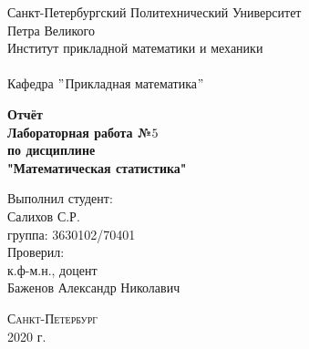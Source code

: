 \documentclass[a4]{article}
\begin{document}
	\def\contentsname{\LARGE{Содержание}}
	\thispagestyle{empty}
	\begin{center} 
		\vspace{2cm} 
		{\Large \sc Санкт-Петербургский Политехнический Университет}\\
		\vspace{2mm}
		{\Large\sc Петра Великого}\\
		\vspace{1cm}
		{\large \sc Институт прикладной математики и механики\\ 
			\vspace{0.5mm}
			\textsc{}}\\ 
		\vspace{0.5mm}
		{\large\sc Кафедра $"$Прикладная математика$"$}\\
		\vspace{15mm}
		
		
		{\sc \textbf{Отчёт\\
			Лабораторная работа №$5$\\
			по дисциплине\\
			"Математическая статистика"}
			\vspace{6mm}
			
		}
		\vspace*{2mm}
		
		
		\begin{flushleft}
			\vspace{4cm}
			\sc Выполнил студент:\\
			\sc Салихов С.Р.\\
			\sc группа: 3630102/70401\\
			\vspace{1cm}
			\sc Проверил:\\
			\sc к.ф-м.н., доцент\\
			\sc Баженов Александр Николавич
			\vspace{20mm}
		\end{flushleft}
	\end{center} 
	\begin{center}
		\vfill {\large\textsc{Санкт-Петербург}}\\ 
		2020 г.
	\end{center}
	
	\newpage
	\pagestyle{plain}
	
	
	
\end{document}
